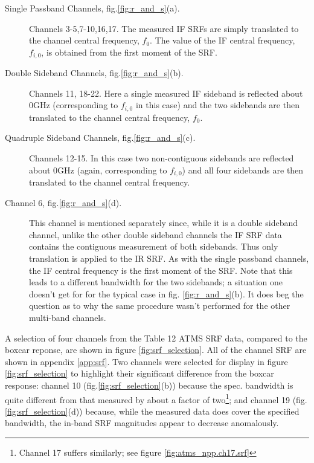 \begin{description}
  \item[Single Passband Channels, fig.\ref{fig:r_and_s}(a).] Channels 3-5,7-10,16,17. The measured IF SRFs are simply translated to the channel central frequency, $f_0$. The value of the IF central frequency, $f_{i,0}$, is obtained from the first moment of the SRF.
  \item[Double Sideband Channels, fig.\ref{fig:r_and_s}(b).] Channels 11, 18-22. Here a single measured IF sideband is reflected about 0GHz (corresponding to $f_{i,0}$ in this case) and the two sidebands are then translated to the channel central frequency, $f_0$.
  \item[Quadruple Sideband Channels, fig.\ref{fig:r_and_s}(c).] Channels 12-15. In this case two non-contiguous sidebands are reflected about 0GHz (again, corresponding to $f_{i,0}$) and all four sidebands are then translated to the channel central frequency. 
  \item[Channel 6, fig.\ref{fig:r_and_s}(d).] This channel is mentioned separately since, while it is a double sideband channel, unlike the other double sideband channels the IF SRF data contains the contiguous measurement of both sidebands. Thus only translation is applied to the IR SRF. As with the single passband channels, the IF central frequency is the first moment of the SRF. Note that this leads to a different bandwidth for the two sidebands; a situation one doesn't get for for the typical case in fig. \ref{fig:r_and_s}(b). It does beg the question as to why the same procedure wasn't performed for the other multi-band channels.
\end{description}

A selection of four channels from the Table 12 ATMS SRF data, compared to the boxcar reponse, are shown in figure \ref{fig:srf_selection}. All of the channel SRF are shown in appendix \ref{app:srf}. Two channels were selected for display in figure \ref{fig:srf_selection} to highlight their significant difference from the boxcar response: channel 10 (fig.\ref{fig:srf_selection}(b)) because the spec. bandwidth is quite different from that measured by about a factor of two\footnote{Channel 17 suffers similarly; see figure \ref{fig:atms_npp.ch17.srf}}; and channel 19 (fig.\ref{fig:srf_selection}(d)) because, while the measured data does cover the specified bandwidth, the in-band SRF magnitudes appear to decrease anomalously.

